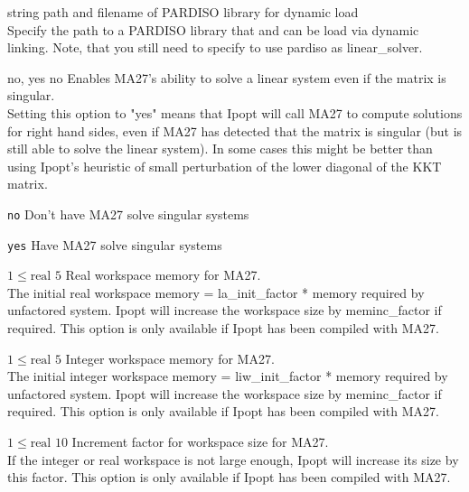 %
{\textrm{string}}%
{}%
{path and filename of PARDISO library for dynamic load\\
Specify the path to a PARDISO library that and can be load via dynamic linking. Note, that you still need to specify to use pardiso as linear\_solver.}%
{}

%
{no, yes}%
{no}%
{Enables MA27's ability to solve a linear system even if the matrix is singular.\\
Setting this option to "yes" means that Ipopt will call MA27 to compute solutions for right hand sides, even if MA27 has detected that the matrix is singular (but is still able to solve the linear system). In some cases this might be better than using Ipopt's heuristic of small perturbation of the lower diagonal of the KKT matrix.}%
{\begin{list}{}{
\setlength{\parsep}{0em}
\setlength{\leftmargin}{5ex}
\setlength{\labelwidth}{2ex}
\setlength{\itemindent}{0ex}
\setlength{\topsep}{0pt}}
\item[\texttt{no}] Don't have MA27 solve singular systems
\item[\texttt{yes}] Have MA27 solve singular systems
\end{list}
}

%
{$1\leq\textrm{real}$}%
{$5$}%
{Real workspace memory for MA27.\\
The initial real workspace memory = la\_init\_factor * memory required by unfactored system. Ipopt will increase the workspace size by meminc\_factor if required.  This option is only available if  Ipopt has been compiled with MA27.}%
{}

%
{$1\leq\textrm{real}$}%
{$5$}%
{Integer workspace memory for MA27.\\
The initial integer workspace memory = liw\_init\_factor * memory required by unfactored system. Ipopt will increase the workspace size by meminc\_factor if required.  This option is only available if Ipopt has been compiled with MA27.}%
{}

%
{$1\leq\textrm{real}$}%
{$10$}%
{Increment factor for workspace size for MA27.\\
If the integer or real workspace is not large enough, Ipopt will increase its size by this factor.  This option is only available if Ipopt has been compiled with MA27.}%
{}

